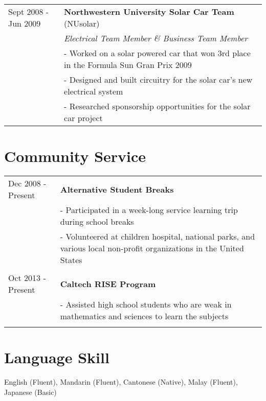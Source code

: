 \documentclass[letterpaper]{article}
\begin{document}
\begin{tabular*}{\textwidth}{@{\extracolsep{\fill}} l l}
Sept 2008 - Jun 2009 &\textbf{Northwestern University Solar Car Team} (NUsolar)\\
& \textit{Electrical Team Member \& Business Team Member} \\
 & \multicolumn{1}{p{0.8\textwidth}}{- Worked on a solar powered car that won 3rd place in the Formula Sun Gran Prix 2009} \\
&\multicolumn{1}{p{0.8\textwidth}}{- Designed and built circuitry for the solar car's new electrical system} \\
&\multicolumn{1}{p{0.8\textwidth}}{- Researched sponsorship opportunities for the solar car project}

\end{tabular*}

\newpage
\section*{Community Service}

\begin{tabular*}{\textwidth}{@{\extracolsep{\fill}} l l}
Dec 2008 - Present &\textbf{Alternative Student Breaks}\\
 & \multicolumn{1}{p{0.8\textwidth}}{- Participated in a week-long service learning trip during school breaks} \\
&\multicolumn{1}{p{0.8\textwidth}}{- Volunteered at children hospital, national parks, and various local non-profit organizations in the United States} \\\\

Oct 2013 - Present &\textbf{Caltech RISE Program}\\
 & \multicolumn{1}{p{0.8\textwidth}}{- Assisted high school students who are weak in mathematics and sciences to learn the subjects} \\ \\
 
\end{tabular*}

\section*{Language Skill}

English (Fluent), Mandarin (Fluent), Cantonese (Native), Malay (Fluent), Japanese (Basic)
\end{document}
